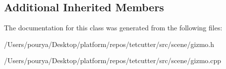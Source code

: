 \subsection*{Additional Inherited Members}


The documentation for this class was generated from the following files\+:\begin{DoxyCompactItemize}
\item 
/\+Users/pourya/\+Desktop/platform/repos/tetcutter/src/scene/gizmo.\+h\item 
/\+Users/pourya/\+Desktop/platform/repos/tetcutter/src/scene/gizmo.\+cpp\end{DoxyCompactItemize}
